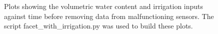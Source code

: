 \documentclass[12pt]{scrartcl}
\begin{document}
\begin{figure}[!htb]
        \caption{\label{fig:VWC-bad-data} Plots showing the volumetric water content and irrigation inputs against time before removing data from malfunctioning sensors. The script facet\_with\_irrigation.py was used to build these plots.}
\end{figure}
\end{document}
